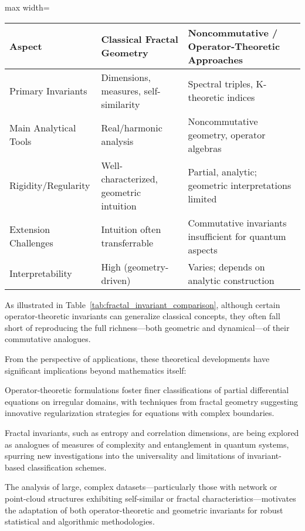\documentclass[sigconf]{acmart}
\begin{document}
\begin{table*}[htbp]
\centering
\caption{Comparison of Classical and Noncommutative Fractal Invariants}
\label{tab:fractal_invariant_comparison}
\begin{adjustbox}{max width=\textwidth}
\begin{tabular}{lll}
\toprule
\textbf{Aspect} & \textbf{Classical Fractal Geometry} & \textbf{Noncommutative / Operator-Theoretic Approaches} \\
\midrule
Primary Invariants & Dimensions, measures, self-similarity & Spectral triples, K-theoretic indices \\
Main Analytical Tools & Real/harmonic analysis & Noncommutative geometry, operator algebras \\
Rigidity/Regularity & Well-characterized, geometric intuition & Partial, analytic; geometric interpretations limited \\
Extension Challenges & Intuition often transferrable & Commutative invariants insufficient for quantum aspects \\
Interpretability & High (geometry-driven) & Varies; depends on analytic construction \\
\bottomrule
\end{tabular}
\end{adjustbox}
\end{table*}

As illustrated in Table~\ref{tab:fractal_invariant_comparison}, although certain operator-theoretic invariants can generalize classical concepts, they often fall short of reproducing the full richness—both geometric and dynamical—of their commutative analogues.

From the perspective of applications, these theoretical developments have significant implications beyond mathematics itself:

Operator-theoretic formulations foster finer classifications of partial differential equations on irregular domains, with techniques from fractal geometry suggesting innovative regularization strategies for equations with complex boundaries.

Fractal invariants, such as entropy and correlation dimensions, are being explored as analogues of measures of complexity and entanglement in quantum systems, spurring new investigations into the universality and limitations of invariant-based classification schemes.

The analysis of large, complex datasets—particularly those with network or point-cloud structures exhibiting self-similar or fractal characteristics—motivates the adaptation of both operator-theoretic and geometric invariants for robust statistical and algorithmic methodologies.
\end{document}
